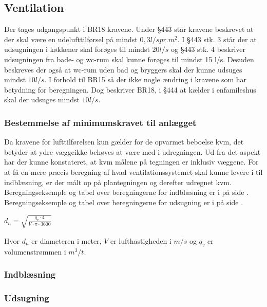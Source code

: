 \subsection{Ventilation} \label{sub:ventilation}
Der tages udgangspunkt i BR18 \cite{BR18:Online} kravene.
Under \S443 står kravene beskrevet at der skal være en udelufttilførsel på mindst $0,3 l/s pr. m^2$.
I \S443 stk. 3 står der at udsugningen i køkkener skal forøges til mindst $20 l/s$ og \S443 stk. 4 beskriver udsugningen fra bade- og wc-rum skal kunne forøges til mindst 15 l/s.
Desuden beskreves der også at wc-rum uden bad og bryggers skal der kunne udsuges mindst $10 l/s$. 
I forhold til BR15 så der ikke nogle ændring i kravene som har betydning for beregningen.
Dog beskriver BR18, i \S444 at kælder i enfamileshus skal der udsuges mindst $10 l/s$.

\subsubsection{Bestemmelse af minimumskravet til anlægget} \label{subsub:minimumkrav_ventilation}
Da kravene for lufttilførelsen kun gælder for de opvarmet beboelse kvm,
det betyder at ydre væggeikke behøves at være med i udregningen.
Ud fra det aspekt har der kunne konstateret, at kvm målene på tegningen er inklusiv væggene.
For at få en mere præcis beregning af hvad ventilationssystemet skal kunne levere i til indblæsning,
er der målt op på plantegningen og derefter udregnet kvm. \\
Beregningseksemple og tabel over beregningerne for indblæsning er i  på side \pageref{sub:indblaesning_beregning}. \\
Beregningseksemple og tabel over beregningerne for udsugning er i  på side \pageref{sub:udsugning_beregning}.

\begin{center}
    $
    d_{n} = \sqrt{ \frac{q_{v} \cdot 4}{V\cdot\pi\cdot3600}}
    $ \\ 
\end{center}

Hvor $d_n$ er diameteren i meter, $V$ er lufthastigheden i $m/s$ og $q_v$ er volumenstrømmen i $m^{3}/t$.

\subsubsection{Indblæsning}
\label{subsub:indblaesning}

\subsubsection{Udsugning}
\label{subsub:udsugning}